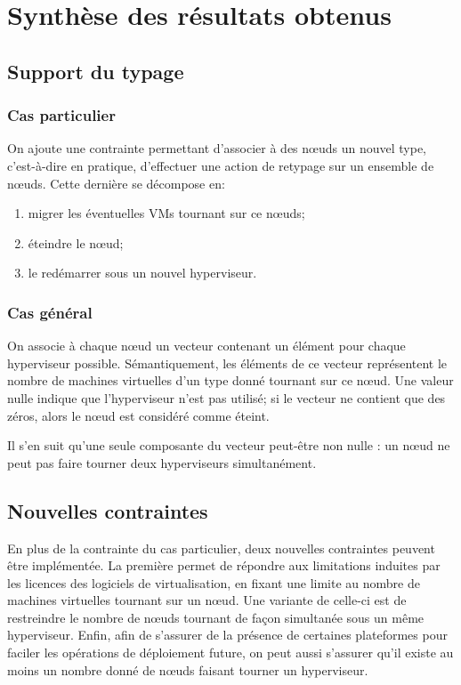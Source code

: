 \documentclass[a4paper]{article}
\begin{document}
\section{Synthèse des résultats obtenus}
\subsection{Support du typage}
\subsubsection{Cas particulier}
On ajoute une contrainte permettant d'associer à des nœuds un
nouvel type, c'est-à-dire en pratique, d'effectuer une action de
retypage sur un ensemble de nœuds. Cette dernière se décompose en:
\begin{enumerate}
	\item migrer les éventuelles VMs tournant sur ce nœuds;
	\item éteindre le nœud;
	\item le redémarrer sous un nouvel hyperviseur.
\end{enumerate}
\subsubsection{Cas général}
On associe à chaque nœud un vecteur contenant un élément pour
chaque hyperviseur possible. Sémantiquement, les éléments de ce
vecteur représentent le nombre de machines virtuelles d'un type donné
tournant sur ce nœud. Une valeur nulle indique que l'hyperviseur
n'est pas utilisé; si le vecteur ne contient que des zéros, alors
le nœud est considéré comme éteint.

Il s'en suit qu'une seule composante du vecteur peut-être non nulle :
un nœud ne peut pas faire tourner deux hyperviseurs simultanément.

\subsection{Nouvelles contraintes}
En plus de la contrainte du cas particulier, deux nouvelles
contraintes peuvent être implémentée. La première permet de répondre
aux limitations induites par les licences des logiciels de
virtualisation, en fixant une limite au nombre de machines virtuelles
tournant sur un nœud. Une variante de celle-ci est de restreindre
le nombre de nœuds tournant de façon simultanée sous un même
hyperviseur. Enfin, afin de s'assurer de la présence de certaines
plateformes pour faciler les opérations de déploiement future, on
peut aussi s'assurer qu'il existe au moins un nombre donné de nœuds
faisant tourner un hyperviseur.
\end{document}
